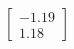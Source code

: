 \documentclass[preview]{standalone}
\begin{document}
\begin{align*}
\begin{bmatrix} -1.19 \\ 1.18 \end{bmatrix}
\end{align*}
\end{document}
